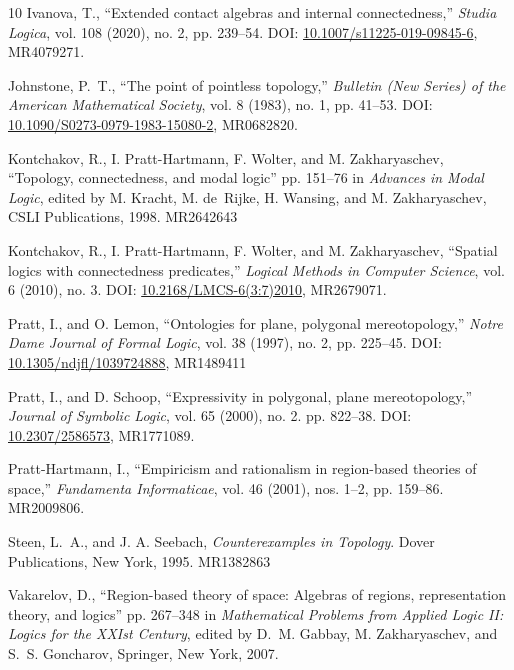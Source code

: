 \documentclass[a4paper,12pt]{amsart}
\numberwithin{equation}{section}
\theoremstyle{mytheoremstyle}
\begin{document}
\begin{thebibliography}{10}
Ivanova, T.,
\newblock ``Extended contact algebras and internal connectedness,''
\newblock \emph{Studia Logica}, vol. 108 (2020), no. 2, pp. 239--54.
\newblock DOI: \url{10.1007/s11225-019-09845-6}, MR4079271.


Johnstone, P.~T.,
\newblock ``The point of pointless topology,''
\newblock \emph{Bulletin (New Series) of the American Mathematical Society}, vol. 8 (1983), no. 1, pp. 41--53.
\newblock DOI: \url{10.1090/S0273-0979-1983-15080-2}, MR0682820.

Kontchakov, R., I. Pratt-Hartmann, F. Wolter, and M. Zakharyaschev,
\newblock ``Topology, connectedness, and modal logic''
\newblock pp. 151--76 in \emph{Advances in Modal Logic}, edited by M. Kracht, M. de~Rijke, H. Wansing, and M. Zakharyaschev, CSLI Publications, 1998.
\newblock MR2642643

Kontchakov, R., I. Pratt-Hartmann, F. Wolter, and M. Zakharyaschev,
\newblock ``Spatial logics with connectedness predicates,''
\newblock \emph{Logical Methods in Computer Science}, vol. 6 (2010), no. 3.
\newblock DOI: \url{10.2168/LMCS-6(3:7)2010}, MR2679071.

Pratt, I., and O. Lemon,
\newblock ``Ontologies for plane, polygonal mereotopology,''
\newblock \emph{Notre Dame Journal of Formal Logic}, vol. 38 (1997), no. 2, pp. 225--45.
\newblock DOI: \url{10.1305/ndjfl/1039724888}, MR1489411


Pratt, I., and D. Schoop,
\newblock ``Expressivity in polygonal, plane mereotopology,''
\newblock \emph{Journal of Symbolic Logic}, vol. 65 (2000), no. 2. pp. 822--38.
\newblock DOI: \url{10.2307/2586573}, MR1771089.


Pratt-Hartmann, I.,
\newblock ``Empiricism and rationalism in region-based theories of space,''
\newblock \emph{Fundamenta Informaticae}, vol. 46 (2001), nos. 1--2, pp. 159--86.
\newblock MR2009806.

Steen, L.~A., and J. A. Seebach,
\newblock \emph{Counterexamples in Topology}.
\newblock Dover Publications, New York, 1995.
\newblock MR1382863


Vakarelov, D.,
\newblock ``Region-based theory of space: Algebras of regions, representation theory, and logics''
\newblock pp. 267--348 in \emph{Mathematical Problems from Applied Logic II: Logics for the XXIst Century}, edited by D.~M. Gabbay, M. Zakharyaschev, and S.~S. Goncharov, Springer, New York, 2007.
\end{thebibliography}
\end{document}
